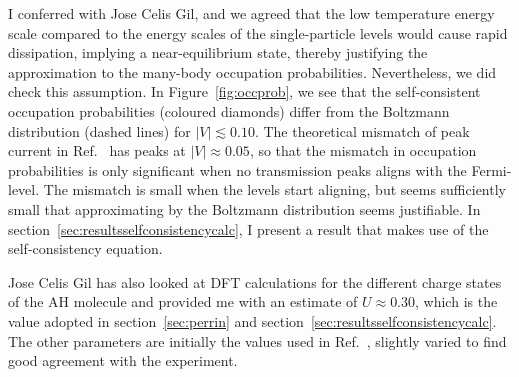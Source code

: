I conferred with Jose Celis Gil, and we agreed that the low temperature energy scale compared to the energy scales of the single-particle levels would cause rapid dissipation, implying a near\hyp{}equilibrium state, thereby justifying the approximation to the many-body occupation probabilities. Nevertheless, we did check this assumption. In Figure~\ref{fig:occprob}, we see that the self-consistent occupation probabilities (coloured diamonds) differ from the Boltzmann distribution (dashed lines) for $\left|V\right|\lesssim 0.10$. The theoretical mismatch of peak current in Ref.~\cite{perrinnano} has peaks at $\left|V\right|\approx 0.05$, so that the mismatch in occupation probabilities is only significant when no transmission peaks aligns with the Fermi-level. The mismatch is small when the levels start aligning, but seems sufficiently small that approximating by the Boltzmann distribution seems justifiable. In section~\ref{sec:resultsselfconsistencycalc}, I present a result that makes use of the self-consistency equation.


Jose Celis Gil has also looked at DFT calculations for the different charge states of the AH molecule and provided me with an estimate of $U \approx 0.30$, which is the value adopted in section~\ref{sec:perrin} and section~\ref{sec:resultsselfconsistencycalc}. The other parameters are initially the values used in Ref.~\cite{perrinnano}, slightly varied to find good agreement with the experiment.

